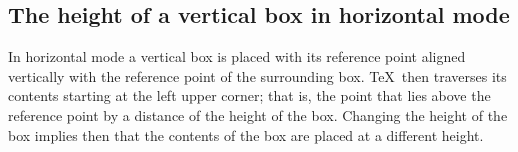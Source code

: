 \documentclass{book}
\begin{document}


\subsection{The height of a vertical box in horizontal mode}

In horizontal mode a vertical box is placed with its
reference point aligned vertically with the reference
point of the surrounding box.
\TeX\ then traverses its contents starting at the left
upper corner; that is, the point that lies above the reference
point by a distance of the height of the box.
Changing the height of the box  implies then that the
contents of the box are placed at a different height.
\end{document}
